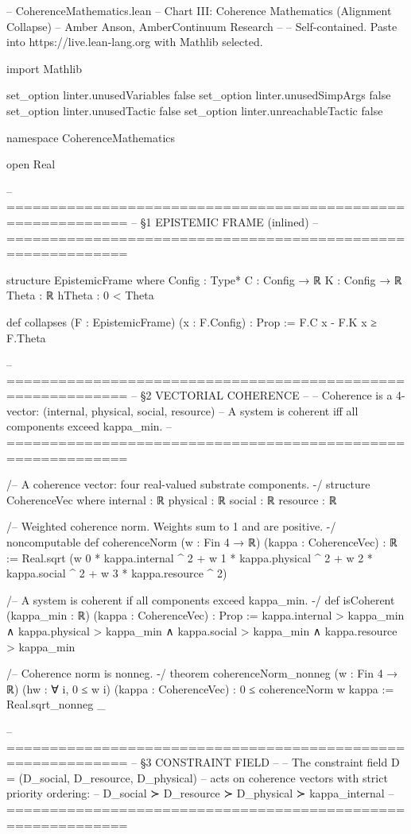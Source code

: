 -- CoherenceMathematics.lean
-- Chart III: Coherence Mathematics (Alignment Collapse)
-- Amber Anson, AmberContinuum Research
--
-- Self-contained. Paste into https://live.lean-lang.org with Mathlib selected.

import Mathlib

set_option linter.unusedVariables false
set_option linter.unusedSimpArgs false
set_option linter.unusedTactic false
set_option linter.unreachableTactic false

namespace CoherenceMathematics

open Real

-- ============================================================
-- §1  EPISTEMIC FRAME (inlined)
-- ============================================================

structure EpistemicFrame where
  Config : Type*
  C      : Config → ℝ
  K      : Config → ℝ
  Theta  : ℝ
  hTheta : 0 < Theta

def collapses (F : EpistemicFrame) (x : F.Config) : Prop :=
  F.C x - F.K x ≥ F.Theta

-- ============================================================
-- §2  VECTORIAL COHERENCE
--
-- Coherence is a 4-vector: (internal, physical, social, resource)
-- A system is coherent iff all components exceed kappa_min.
-- ============================================================

/-- A coherence vector: four real-valued substrate components. -/
structure CoherenceVec where
  internal : ℝ
  physical : ℝ
  social   : ℝ
  resource : ℝ

/-- Weighted coherence norm. Weights sum to 1 and are positive. -/
noncomputable def coherenceNorm (w : Fin 4 → ℝ) (kappa : CoherenceVec) : ℝ :=
  Real.sqrt (w 0 * kappa.internal ^ 2 +
             w 1 * kappa.physical ^ 2 +
             w 2 * kappa.social ^ 2 +
             w 3 * kappa.resource ^ 2)

/-- A system is coherent if all components exceed kappa_min. -/
def isCoherent (kappa_min : ℝ) (kappa : CoherenceVec) : Prop :=
  kappa.internal > kappa_min ∧
  kappa.physical > kappa_min ∧
  kappa.social   > kappa_min ∧
  kappa.resource > kappa_min

/-- Coherence norm is nonneg. -/
theorem coherenceNorm_nonneg (w : Fin 4 → ℝ)
    (hw : ∀ i, 0 ≤ w i) (kappa : CoherenceVec) :
    0 ≤ coherenceNorm w kappa := Real.sqrt_nonneg _

-- ============================================================
-- §3  CONSTRAINT FIELD
--
-- The constraint field D = (D_social, D_resource, D_physical)
-- acts on coherence vectors with strict priority ordering:
--   D_social ≻ D_resource ≻ D_physical ≻ kappa_internal
-- ============================================================

